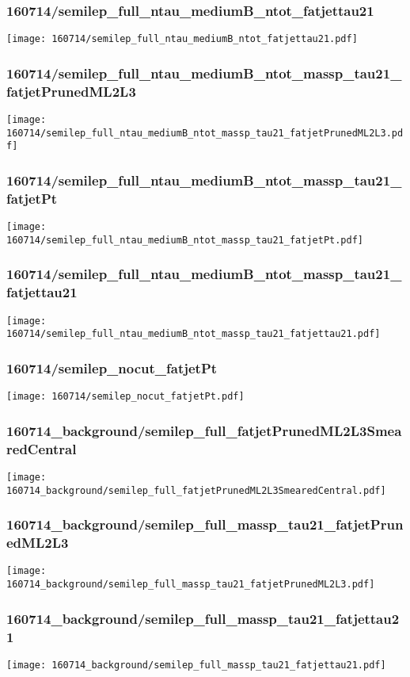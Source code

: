 \begin{frame}
   \frametitle{\small 160714/semilep\_full\_ntau\_mediumB\_ntot\_fatjettau21}
   \centering
   \texttt{[image: 160714/semilep\_full\_ntau\_mediumB\_ntot\_fatjettau21.pdf]}
\end{frame}

\begin{frame}
   \frametitle{\small 160714/semilep\_full\_ntau\_mediumB\_ntot\_massp\_tau21\_fatjetPrunedML2L3}
   \centering
   \texttt{[image: 160714/semilep\_full\_ntau\_mediumB\_ntot\_massp\_tau21\_fatjetPrunedML2L3.pdf]}
\end{frame}

\begin{frame}
   \frametitle{\small 160714/semilep\_full\_ntau\_mediumB\_ntot\_massp\_tau21\_fatjetPt}
   \centering
   \texttt{[image: 160714/semilep\_full\_ntau\_mediumB\_ntot\_massp\_tau21\_fatjetPt.pdf]}
\end{frame}

\begin{frame}
   \frametitle{\small 160714/semilep\_full\_ntau\_mediumB\_ntot\_massp\_tau21\_fatjettau21}
   \centering
   \texttt{[image: 160714/semilep\_full\_ntau\_mediumB\_ntot\_massp\_tau21\_fatjettau21.pdf]}
\end{frame}

\begin{frame}
   \frametitle{\small 160714/semilep\_nocut\_fatjetPt}
   \centering
   \texttt{[image: 160714/semilep\_nocut\_fatjetPt.pdf]}
\end{frame}

\begin{frame}
   \frametitle{\small 160714\_background/semilep\_full\_fatjetPrunedML2L3SmearedCentral}
   \centering
   \texttt{[image: 160714\_background/semilep\_full\_fatjetPrunedML2L3SmearedCentral.pdf]}
\end{frame}

\begin{frame}
   \frametitle{\small 160714\_background/semilep\_full\_massp\_tau21\_fatjetPrunedML2L3}
   \centering
   \texttt{[image: 160714\_background/semilep\_full\_massp\_tau21\_fatjetPrunedML2L3.pdf]}
\end{frame}

\begin{frame}
   \frametitle{\small 160714\_background/semilep\_full\_massp\_tau21\_fatjettau21}
   \centering
   \texttt{[image: 160714\_background/semilep\_full\_massp\_tau21\_fatjettau21.pdf]}
\end{frame}

